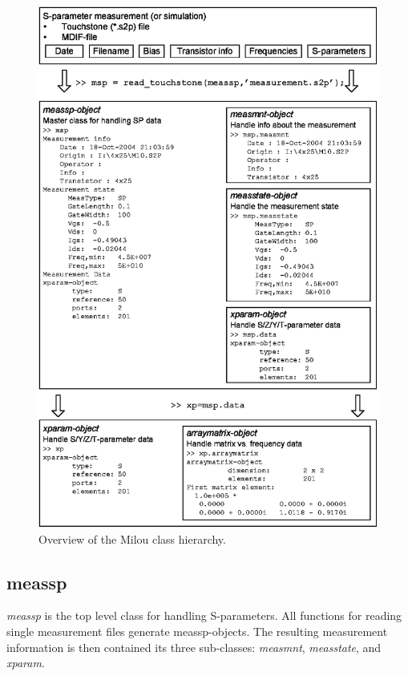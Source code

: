 \begin{figure}[htbf]
  \includegraphics[width=\textwidth]{Figures/ClassOverview3.eps}
  \caption{Overview of the Milou class hierarchy.}\label{fig:ClassHierarchy}
\end{figure}

\subsection{meassp}
\emph{meassp} is the top level class for handling S-parameters.
All functions for reading single measurement files generate
meassp-objects. The resulting measurement information is then
contained its three sub-classes: \emph{measmnt}, \emph{measstate},
and \emph{xparam}.

